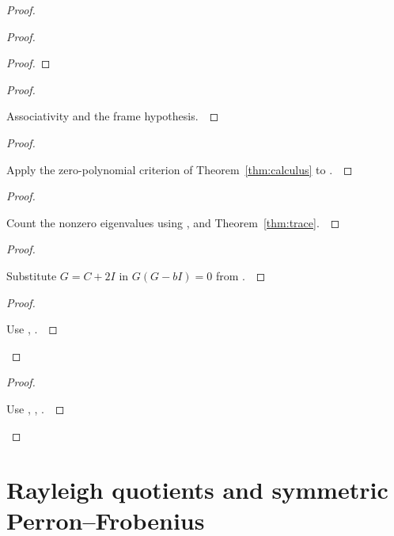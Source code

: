 \documentclass[11pt]{amsart}
\let\qed\relax
\theoremstyle{definition}
\begin{document}
\begin{proof}
\begin{proof}
\begin{proof}
\end{proof}
\begin{proof}
\pf\ \raggedright Associativity and the frame hypothesis.~\qed
\end{proof}
\begin{proof}
\pf\ \raggedright Apply the zero-polynomial criterion of Theorem~\ref{thm:calculus} to .~\qed
\end{proof}
\begin{proof}
\pf\ \raggedright Count the nonzero eigenvalues using ,  and Theorem~\ref{thm:trace}.~\qed
\end{proof}
\begin{proof}
\pf\ \raggedright Substitute $G=C+2I$ in $G(G-bI)=0$ from .~\qed
\end{proof}
\qedstep
\begin{proof}
\pf\ \raggedright Use , .~\qed
\end{proof}
\end{proof}
\qedstep
\begin{proof}
\pf\ \raggedright Use , , .~\qed
\end{proof}
\end{proof}

\section{Rayleigh quotients and symmetric Perron--Frobenius}
\end{document}
